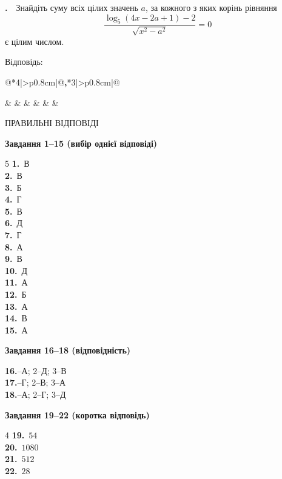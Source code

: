 \documentclass[12pt]{article}
\makeatletter
\newcommand{\sectionTitle}[1]{%
\par\vspace{0.4cm}
\begin{tcolorbox}[colback=titleBg, colframe=titleBg, boxrule=0pt, arc=8pt, halign=center, fontupper=\Large\bfseries\color{mainGreen}]
#1
\end{tcolorbox}\par\vspace{0.3cm}}
\newcommand{\nmtAnswerBox}{%
\par\vspace{0.2cm}\noindent
Відповідь:\ \ 
\begin{tabular}{@{}*{4}{|>{\centering\arraybackslash}p{0.8cm}}|@{\hspace{0.1cm}\textbf{,}\hspace{0.1cm}}*{3}{|>{\centering\arraybackslash}p{0.8cm}}|@{}}
\hline
\rule[-0.2cm]{0pt}{0.7cm} & & & & & & \\
\hline
\end{tabular}
\par\vspace{0.3cm}}
\newcounter{zad}
\newcommand{\zadtask}[1]{\stepcounter{zad}\par\vspace{0.3cm}\noindent\textbf{\thezad.}\ \ #1\par\vspace{0.2cm}}
\makeatother
\begin{document}
\zadtask{Знайдіть суму всіх цілих значень $a$, за кожного з яких корінь рівняння
\[
\dfrac{\log_5(4x - 2a + 1) - 2}{\sqrt{x^2 - a^2}} = 0
\]
є цілим числом.}
\nmtAnswerBox
\newpage

\sectionTitle{ПРАВИЛЬНІ ВІДПОВІДІ}

\noindent\textbf{\large Завдання 1--15 (вибір однієї відповіді)}
\par\vspace{0.2cm}
\begin{multicols}{5}
\noindent
\textbf{1.}~В\\
\textbf{2.}~В\\
\textbf{3.}~Б\\
\textbf{4.}~Г\\
\textbf{5.}~В\\
\textbf{6.}~Д\\
\textbf{7.}~Г\\
\textbf{8.}~А\\
\textbf{9.}~В\\
\textbf{10.}~Д\\
\textbf{11.}~А\\
\textbf{12.}~Б\\
\textbf{13.}~А\\
\textbf{14.}~В\\
\textbf{15.}~А
\end{multicols}

\par\vspace{0.3cm}
\noindent\textbf{\large Завдання 16--18 (відповідність)}
\par\vspace{0.2cm}
\noindent
\textbf{16.}--А; 2--Д; 3--В\\[0.15cm]
\textbf{17.}--Г; 2--В; 3--А\\[0.15cm]
\textbf{18.}\quad 1--А; 2--Г; 3--Д

\par\vspace{0.3cm}
\noindent\textbf{\large Завдання 19--22 (коротка відповідь)}
\par\vspace{0.2cm}
\begin{multicols}{4}
\noindent
\textbf{19.}~$54$\\
\textbf{20.}~$1080$\\
\textbf{21.}~$512$\\
\textbf{22.}~$28$
\end{multicols}
\end{document}
